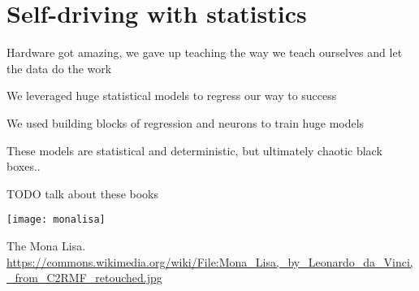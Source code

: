 \setchapterpreamble[u]{\margintoc}
\chapter{Self-driving with statistics}

Hardware got amazing, we gave up teaching the way we teach ourselves and let the data do the work

We leveraged huge statistical models to regress our way to success

We used building blocks of regression and neurons to train huge models

These models are statistical and deterministic, but ultimately chaotic black boxes..

TODO talk about these books \cite{MacAskill2022} \cite{Metz2022Sep} \cite{Metz2022Sep2} \cite{Aytekin}


\begin{marginfigure}[-5.5cm]
	\texttt{[image: monalisa]}
	\caption[The Mona Lisa]{The Mona Lisa.\\ 
	\url{https://commons.wikimedia.org/wiki/File:Mona_Lisa,_by_Leonardo_da_Vinci,_from_C2RMF_retouched.jpg}}
\end{marginfigure}

